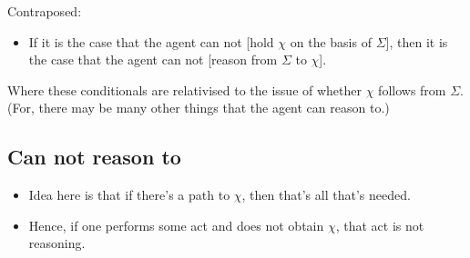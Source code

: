 \documentclass[10pt]{article}
\begin{document}
Contraposed:

\begin{itemize}
\item If it is the case that the agent can not [hold \(\chi\) on the basis of \(\Sigma\)], then it is the case that the agent can not [reason from \(\Sigma\) to \(\chi\)].
\end{itemize}

Where these conditionals are relativised to the issue of whether \(\chi\) follows from \(\Sigma\).
(For, there may be many other things that the agent can reason to.)



\subsection{Can not reason to}
\label{sec:can-not-reason}

\begin{itemize}
\item Idea here is that if there's a path to \(\chi\), then that's all that's needed.
\item Hence, if one performs some act and does not obtain \(\chi\), that act is not reasoning.
\end{itemize}
\end{document}
